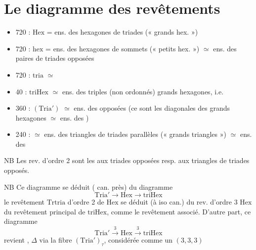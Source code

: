 \documentclass[11pt,a4paper]{article}
\begin{document}
\section{Le diagramme des revêtements}

\begin{itemize}
  \item 720 : $\mathrm{Hex}$ = ens. des hexagones de triades  (« grands hex. ») 
  \item 720 : $\mathrm{hex}$ = ens. des hexagones de sommets  \struck{\ill{}} (« petits hex. »)
  $\simeq$ ens. des paires de triades opposées
  \item 720 : $\mathrm{tria}$ $\simeq$ 
  \item 40 : $\mathrm{triHex}$ $\simeq$ ens. des triples (non ordonnés)   grands hexagones, i.e. \struck{\ill{}}  \ill{}
  \item 360 : $(\mathrm{Tria}')$ $\simeq$ ens. des   opposées  (ce sont les diagonales des grands hexagones $\simeq$ ens. des  )
  \item 240 : \struck{\ill{}}  $\simeq$ ens. des triangles de triades parallèles (« grands triangles ») $\simeq$ ens. des 
\end{itemize}



NB Les rev. d'ordre 2 sont les  aux triades opposées resp. aux triangles de triades  opposés.

NB Ce diagramme se déduit ( can. près) du diagramme
\[
  \mathrm{Tria}' \to \mathrm{Hex} \to \mathrm{triHex}
\]
 le revêtement $\mathrm{Trtria}$ d'ordre 2 de $\mathrm{Hex}$ se déduit (à iso can.) du rev. d'ordre 3 $\mathrm{Hex}$ du revêtement principal de $\mathrm{triHex}$, comme le revêtement associé. D'autre part, ce diagramme
\[
  \mathrm{Tria}' \xrightarrow{\ 3\ } \mathrm{Hex} \xrightarrow{\ 3\ } \mathrm{triHex}
\]
revient  , $\Delta$ via la fibre $(\mathrm{Tria}')_\tau$, considérée comme un $(3,3,3)$
\end{document}
